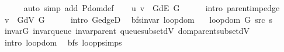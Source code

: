 \begin{isabellebody}
\ \ \ \ \isamarkupfalse%
\ {\isacharparenleft}{\kern0pt}auto\ simp\ add{\isacharcolon}{\kern0pt}\ P{\isachardot}{\kern0pt}dom{\isacharunderscore}{\kern0pt}def{\isacharparenright}{\kern0pt}\isanewline
\ \ \isamarkupfalse%
\ {\isachardoublequoteopen}{\isacharparenleft}{\kern0pt}u{\isacharcomma}{\kern0pt}\ v{\isacharparenright}{\kern0pt}\ {\isasymin}\ G{\isachardot}{\kern0pt}dE\ G{\isachardoublequoteclose}\isanewline
\ \ \ \ \isamarkupfalse%
\ {\isacharparenleft}{\kern0pt}intro\ parent{\isacharunderscore}{\kern0pt}imp{\isacharunderscore}{\kern0pt}edge{\isacharparenright}{\kern0pt}\isanewline
\ \ \isamarkupfalse%
\ {\isachardoublequoteopen}v\ {\isasymin}\ G{\isachardot}{\kern0pt}dV\ G{\isachardoublequoteclose}\isanewline
\ \ \ \ \isamarkupfalse%
\ {\isacharparenleft}{\kern0pt}intro\ G{\isachardot}{\kern0pt}edgeD{\isacharparenleft}{\kern0pt}{}{\isacharparenright}{\kern0pt}{\isacharparenright}{\kern0pt}\isanewline
{}\isamarkupfalse%
%
\endisatagproof
{\isafoldproof}%
%
\isadelimproof
\isanewline
%
\endisadelimproof
%
\isadeliminvisible
\isanewline
%
\endisadeliminvisible
%
\isataginvisible
{}\isamarkupfalse%
\ {\isacharparenleft}{\kern0pt}\ bfs{\isacharunderscore}{\kern0pt}invar{\isacharparenright}{\kern0pt}\ loop{\isacharunderscore}{\kern0pt}dom{\isacharcolon}{\kern0pt}\isanewline
\ \ \ {\isachardoublequoteopen}loop{\isacharunderscore}{\kern0pt}dom\ {\isacharparenleft}{\kern0pt}G{\isacharcomma}{\kern0pt}\ src{\isacharcomma}{\kern0pt}\ s{\isacharparenright}{\kern0pt}{\isachardoublequoteclose}%
\endisataginvisible
{\isafoldinvisible}%
%
\isadeliminvisible
\isanewline
%
\endisadeliminvisible
%
\isadelimproof
\ \ %
\endisadelimproof
%
\isatagproof
{}\isamarkupfalse%
\ invar{\isacharunderscore}{\kern0pt}G\ invar{\isacharunderscore}{\kern0pt}queue\ invar{\isacharunderscore}{\kern0pt}parent\ queue{\isacharunderscore}{\kern0pt}subset{\isacharunderscore}{\kern0pt}dV\ dom{\isacharunderscore}{\kern0pt}parent{\isacharunderscore}{\kern0pt}subset{\isacharunderscore}{\kern0pt}dV\isanewline
\ \ \isamarkupfalse%
\ {\isacharparenleft}{\kern0pt}intro\ loop{\isacharunderscore}{\kern0pt}dom{\isacharparenright}{\kern0pt}%
\endisatagproof
{\isafoldproof}%
%
\isadelimproof
\isanewline
%
\endisadelimproof
%
\isadeliminvisible
\isanewline
%
\endisadeliminvisible
%
\isataginvisible
{}\isamarkupfalse%
\ {\isacharparenleft}{\kern0pt}\ bfs{\isacharparenright}{\kern0pt}\ loop{\isacharunderscore}{\kern0pt}psimps{\isacharcolon}{\kern0pt}\isanewline

\end{isabellebody}
